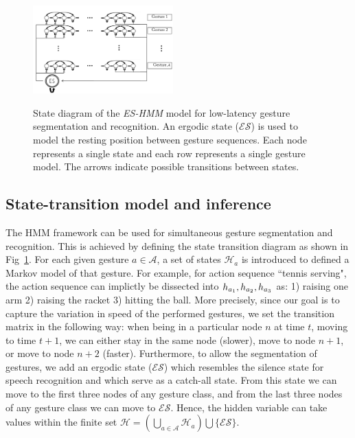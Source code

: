\begin{figure}[t]
  \centering
  \includegraphics[width=0.48\textwidth]{images/HMM_2_new}\\
  \caption{
    State diagram of the \emph{ES-HMM} model for low-latency gesture segmentation and recognition. An ergodic state (\emph{$\mathcal{ES}$}) is used to model the resting position between gesture sequences. Each node represents a single state and each row represents a single gesture model. The arrows indicate possible transitions between states.}
    \label{HMM_ES}
\end{figure}


\subsection{State-transition model and inference}
\label{sec:statemodel}


The HMM framework can be used for simultaneous gesture segmentation and recognition.
This is achieved by defining the state transition diagram as shown in Fig~\ref{HMM_ES}. For each given gesture $a \in \mathcal{A}$, a set of states $\mathcal{H}_a$ is introduced to defined a Markov model of that gesture. For example, for action sequence ``tennis serving", the action sequence can implictly be dissected into $h_{a_1}, h_{a_2}, h_{a_3}$ as: 1) raising one arm 2) raising the racket 3) hitting the ball.
More precisely, since our goal is to capture the variation in speed of the performed gestures, we set the transition matrix \transitionmatrix{}  in the following way: when being in a particular node $n$ at time $t$, moving to time $t + 1$, we can either stay in the same node (slower), move to node $n + 1$, or move to node $n+2$ (faster).
%
Furthermore, to allow the segmentation of gestures, we add an ergodic state
(\emph{$\mathcal{ES}$}) which resembles the silence state for speech recognition and which serve as a catch-all state.
From this state we can move to the first three nodes of any gesture class, and from the last three nodes of any gesture class we can move to $\mathcal{ES}$.
Hence, the hidden variable \hiddenvariable{} can take values within the finite set
 $\mathcal{H}=(\bigcup _{a \in \mathcal{A}} \mathcal{H}_a) \bigcup \{\mathcal{ES}\}$.

